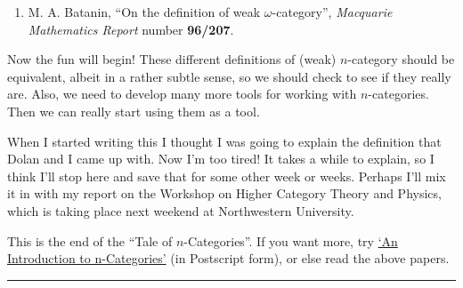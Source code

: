 \documentclass{article}
\def\tightlist{}
\begin{document}
\begin{enumerate}
\def\labelenumi{\arabic{enumi})}
\setcounter{enumi}{8}
\tightlist
\item
  M. A. Batanin, ``On the definition of weak \(\omega\)-category'',
  \emph{Macquarie Mathematics Report} number \textbf{96/207}.
\end{enumerate}

Now the fun will begin! These different definitions of (weak)
\(n\)-category should be equivalent, albeit in a rather subtle sense, so
we should check to see if they really are. Also, we need to develop many
more tools for working with \(n\)-categories. Then we can really start
using them as a tool.

When I started writing this I thought I was going to explain the
definition that Dolan and I came up with. Now I'm too tired! It takes a
while to explain, so I think I'll stop here and save that for some other
week or weeks. Perhaps I'll mix it in with my report on the Workshop on
Higher Category Theory and Physics, which is taking place next weekend
at Northwestern University.

This is the end of the ``Tale of \(n\)-Categories''. If you want more,
try \href{http://math.ucr.edu/home/baez/ncat.ps}{`An Introduction to
n-Categories'} (in Postscript form), or else read the above papers.

\begin{center}\rule{0.5\linewidth}{0.5pt}\end{center}
\end{document}
